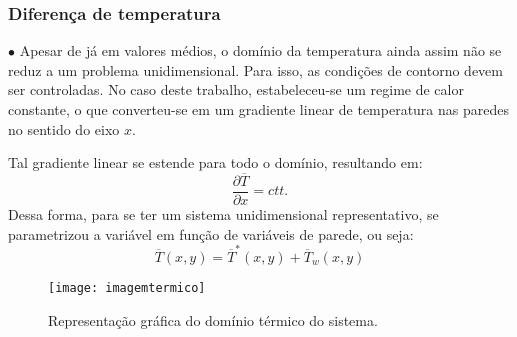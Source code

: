 \documentclass[xcolor=dvipsnames,10pt,aspectratio=169]{beamer}
\begin{document}
		\begin{frame}
			\frametitle{Diferença de temperatura}
			$\bullet$ Apesar de já em valores médios, o domínio da temperatura ainda assim não se reduz a um problema unidimensional. Para isso, as condições de contorno devem ser controladas. No caso deste trabalho, estabeleceu-se um regime de calor constante, o que converteu-se em um gradiente linear de temperatura nas paredes no sentido do eixo $x$.  \\
			\begin{minipage}[h!]{0.36\textwidth}
				Tal gradiente linear se estende para todo o domínio, resultando em:
				\begin{equation}
				\frac{\partial \overline{T}}{\partial x} = ctt.
				\end{equation}
				Dessa forma, para se ter um sistema unidimensional representativo, se parametrizou a variável em função de variáveis de parede, ou seja:
				\begin{equation}
				\overline{T}(x,y) = \overline{T}^\ast(x , y) + \overline{T}_w(x , y)
				\end{equation}
			\end{minipage}\hfill
			\begin{minipage}[h!]{0.60\textwidth}
			\begin{figure}
				\centering
				\texttt{[image: imagemtermico]}
				\caption{Representação gráfica do domínio térmico do sistema.}
				\label{temperatura}
			\end{figure}
			\end{minipage}
		\end{frame}
		
		
		
		
		
\end{document}
